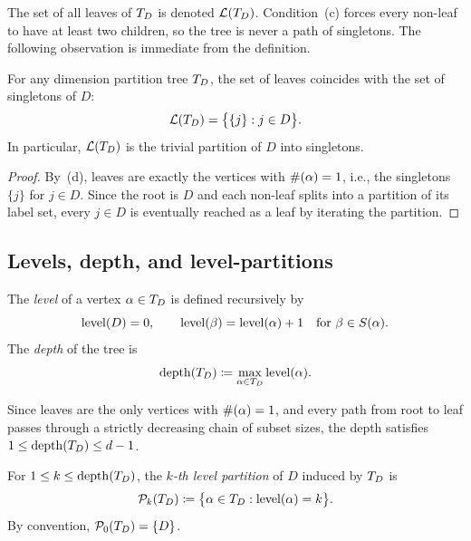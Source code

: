 The set of all leaves of $T_D$ is denoted $\mathcal{L}(T_D)$.
Condition~(c) forces every non-leaf to have at least two children,
so the tree is never a path of singletons. The following observation
is immediate from the definition.

\begin{proposition}
\label{prop:leaves_trivial}
For any dimension partition tree $T_D$, the set of leaves coincides
with the set of singletons of $D$:
\begin{equation*}
    \mathcal{L}(T_D) = \bigl\{\{j\} : j \in D\bigr\}.
\end{equation*}
In particular, $\mathcal{L}(T_D)$ is the trivial partition of $D$ into
singletons.
\end{proposition}

\begin{proof}
By~(d), leaves are exactly the vertices with $\#(\alpha) = 1$,
i.e., the singletons $\{j\}$ for $j \in D$. Since the root is $D$
and each non-leaf splits into a partition of its label set, every
$j \in D$ is eventually reached as a leaf by iterating the partition.
\end{proof}

\subsection*{Levels, depth, and level-partitions}

\begin{definition}
\label{def:level_depth}
The \emph{level} of a vertex $\alpha \in T_D$ is defined recursively by
\begin{equation*}
    \mathrm{level}(D) = 0,
    \qquad
    \mathrm{level}(\beta) = \mathrm{level}(\alpha) + 1
    \quad \text{for } \beta \in S(\alpha).
\end{equation*}
The \emph{depth} of the tree is
\begin{equation}
\label{eq:depth}
    \mathrm{depth}(T_D) \coloneqq \max_{\alpha \in T_D} \mathrm{level}(\alpha).
\end{equation}
\end{definition}

Since leaves are the only vertices with $\#(\alpha) = 1$, and
every path from root to leaf passes through a strictly decreasing
chain of subset sizes, the depth satisfies $1 \leq \mathrm{depth}(T_D) \leq d-1$.

\begin{definition}
\label{def:level_partition}
For $1 \leq k \leq \mathrm{depth}(T_D)$, the \emph{$k$-th level partition} of
$D$ induced by $T_D$ is
\begin{equation}
\label{eq:level_partition}
    \mathcal{P}_{k}(T_D)
    \coloneqq \bigl\{\alpha \in T_D : \mathrm{level}(\alpha) = k\bigr\}.
\end{equation}
By convention, $\mathcal{P}_{0}(T_D) = \{D\}$.
\end{definition}

